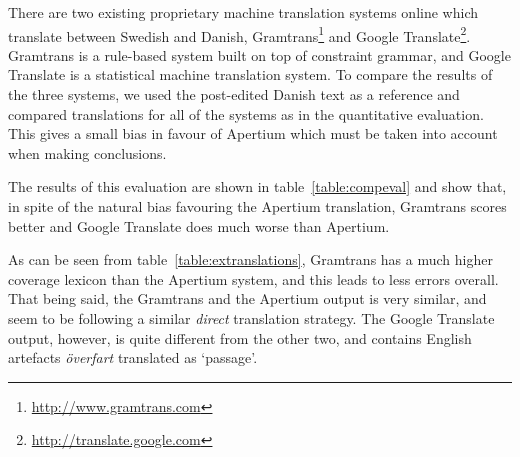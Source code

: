 \documentclass[11pt]{article}
\begin{document}
There are two existing proprietary machine translation systems online which translate 
between Swedish and Danish, Gramtrans\footnote{\url{http://www.gramtrans.com}} and Google
Translate\footnote{\url{http://translate.google.com}}. Gramtrans is a rule-based system
built on top of constraint grammar, and Google Translate is a statistical machine translation
system. To compare the results of the three systems, we used the post-edited Danish text as a
reference and compared translations for all of the systems as in the quantitative evaluation.
This gives a small bias in favour of Apertium which must be taken into account when making conclusions.


The results of this evaluation are shown in table~\ref{table:compeval} and show that, in spite 
of the natural bias favouring the Apertium translation, Gramtrans scores better and Google 
Translate does much worse than Apertium. 

As can be seen from table~\ref{table:extranslations}, Gramtrans has a much higher coverage lexicon 
than the Apertium system, and this leads to less errors overall. That being said, the Gramtrans
and the Apertium output is very similar, and seem to be following a similar \emph{direct} translation strategy. The 
Google Translate output, however, is quite different from the other two, and contains English 
artefacts \emph{överfart} translated as `passage'. 

\end{document}

